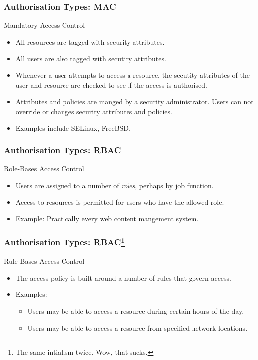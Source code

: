 \documentclass[10pt]{beamer}
\begin{document}
\begin{frame}
  \frametitle{Authorisation Types: MAC}

  Mandatory Access Control

  \begin{itemize}
  \item All resources are tagged with security attributes.
  \item All users are also tagged with secutiry attributes.
  \item Whenever a user attempts to access a resource, the secutity attributes of the 
	  user and resource are checked to see if the access is authorised.
  \item Attributes and policies are manged by a security administrator. Users
	  can not override or changes security attributes and policies.
  \item Examples include SELinux, FreeBSD.

  \end{itemize}
\end{frame}



\begin{frame}
  \frametitle{Authorisation Types: RBAC}

  Role-Bases Access Control

 \begin{itemize}
	 \item Users are assigned to a number of \emph{roles}, perhaps by job function.
	 \item Access to resources is permitted for users who have the allowed role.
	 \item Example: Practically every web content mangement system.
  \end{itemize}
\end{frame}

\begin{frame}
	\frametitle{Authorisation Types: RBAC\footnote{The same intialism twice.  Wow, that sucks.}}

  Rule-Bases Access Control

 \begin{itemize}
	 \item The access policy is built around a number of rules that govern access. 
	 \item Examples:
		 \begin{itemize}
			 \item Users may be able to access a resource during certain hours of the day.
			 \item Users may be able to access a resource from specified network locations.
		 \end{itemize}
  \end{itemize}
\end{frame}
\end{document}
